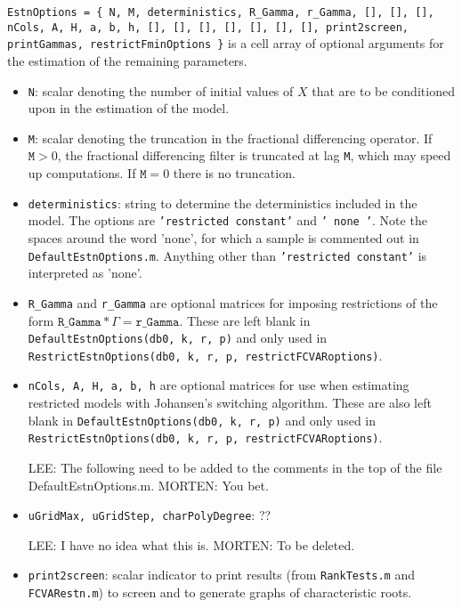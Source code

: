 \documentclass[12pt]{article}
\begin{document}
\noindent \texttt{EstnOptions  = \{ N, M, deterministics, R\_Gamma, r\_Gamma, [], [], [], nCols, A, H, a, b, h, [], [], [], [], [], [], [], print2screen, printGammas, restrictFminOptions \}} is a cell array of optional arguments for the estimation of the remaining parameters. 
 
\begin{itemize}
\item \texttt{N}: scalar denoting the number of initial values of $X$ that are to be conditioned upon in the estimation of the model. 
\item \texttt{M}: scalar denoting the truncation in the fractional differencing operator. If $\texttt{M}>0$, the fractional differencing filter is truncated at lag \texttt{M}, which may speed up computations. If $\texttt{M}=0$ there is no truncation.

\item \texttt{deterministics}: string to determine the deterministics included in the model. The options are \texttt{'restricted constant'} and \texttt{'         none      '}. Note the spaces around the word 'none', for which a sample is commented out in \texttt{DefaultEstnOptions.m}. Anything other than \texttt{'restricted constant'} is interpreted as 'none'.

\item \texttt{R\_Gamma} and \texttt{r\_Gamma} are optional matrices for imposing restrictions of the form $\texttt{R\_Gamma} * \Gamma = \texttt{r\_Gamma}$. These are left blank in \texttt{DefaultEstnOptions(db0, k, r, p)} and only used in \texttt{RestrictEstnOptions(db0, k, r, p, restrictFCVARoptions)}.

\item \texttt{nCols, A, H, a, b, h} are optional matrices for use when estimating restricted models with Johansen's switching algorithm. These are also left blank in \texttt{DefaultEstnOptions(db0, k, r, p)} and only used in \texttt{RestrictEstnOptions(db0, k, r, p, restrictFCVARoptions)}.

LEE: The following need to be added to the comments in the top of the file DefaultEstnOptions.m.
MORTEN: You bet.

\item \texttt{uGridMax, uGridStep, charPolyDegree}: ??

LEE: I have no idea what this is.
MORTEN: To be deleted.

\item \texttt{print2screen}: scalar indicator to print results (from \texttt{RankTests.m} and \texttt{FCVARestn.m}) to screen and to generate graphs of characteristic roots.


\end{itemize}
\end{document}
